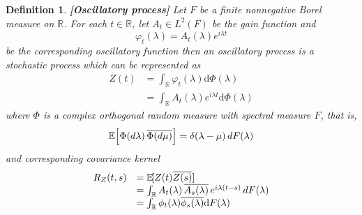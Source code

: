 \documentclass{article}
\newcommand{\mathd}{\mathrm{d}}
\newcommand{\tmem}[1]{{\em #1\/}}
\newcommand{\tmstrong}[1]{\textbf{#1}}
\newtheorem{definition}{Definition}
\begin{document}
\begin{definition}
  {\tmstrong{[Oscillatory process]\label{def:osc_proc} }}Let $F$ be a finite
  nonnegative Borel measure on $\mathbb{R}$. For each $t \in \mathbb{R}$, let
  $A_t \in L^2 (F)$ be the gain function and
  \begin{equation}
    \varphi_t (\lambda) = A_t (\lambda) e^{i \lambda t} \label{of}
  \end{equation}
  be the corresponding oscillatory function then an {\tmem{oscillatory
  process}} is a stochastic process which can be represented as
  \begin{equation}
    \begin{array}{ll}
      Z (t) & = \int_{\mathbb{R}} \varphi_t (\lambda) \mathd \Phi (\lambda)\\
      & = \int_{\mathbb{R}} A_t (\lambda) e^{i \lambda t} \mathd \Phi
      (\lambda)
    \end{array}
  \end{equation}
  where $\Phi$ is a complex orthogonal random measure with spectral measure
  $F$, that is,
  \begin{equation}
    \mathbb{E} \hspace{-0.17em} \left[ \Phi (d \lambda) \hspace{0.17em}
    \overline{\Phi (d \mu)} \right] = \delta (\lambda - \mu)  \hspace{0.17em}
    dF (\lambda)
  \end{equation}
  and corresponding covariance kernel
  \begin{equation}
    \begin{array}{ll}
      R_Z (t, s) & =\mathbb{E} \hspace{-0.17em} [Z (t) \overline{Z (s)}]\\
      & = \int_{\mathbb{R}} A_t (\lambda) \hspace{0.17em} \overline{A_s
      (\lambda)} \hspace{0.17em} e^{i \lambda (t - s)}  \hspace{0.17em} dF
      (\lambda)\\
      & = \int_{\mathbb{R}} \phi_t (\lambda) \overline{\phi_s (\lambda)}
      \mathd F (\lambda)
    \end{array} \label{covar}
  \end{equation}
\end{definition}
\end{document}
